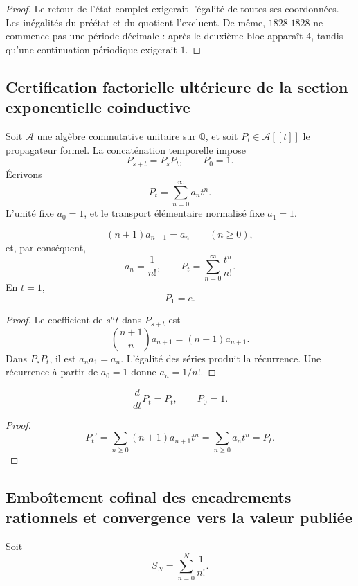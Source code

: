 \begin{proof}
Le retour de l’état complet exigerait l’égalité de toutes ses coordonnées.
Les inégalités du préétat et du quotient l’excluent. De même,
\(1828|1828\) ne commence pas une période décimale : après le deuxième bloc apparaît
\(4\), tandis qu’une continuation périodique exigerait \(1\).
\end{proof}

\subsection{Certification factorielle ultérieure de la section exponentielle coinductive}

Soit \(\mathcal A\) une algèbre commutative unitaire sur \(\mathbb Q\), et
soit \(P_t\in\mathcal A[[t]]\) le propagateur formel. La concaténation
temporelle impose
\[
 P_{s+t}=P_sP_t,
 \qquad
 P_0=1.
\]
Écrivons
\[
 P_t=\sum_{n=0}^{\infty}a_nt^n.
\]
L’unité fixe \(a_0=1\), et le transport élémentaire normalisé fixe
\(a_1=1\).

\begin{theorem}
\label{p12-83-c9-s2:thm:recurrencia-factorial-e}
\[
 (n+1)a_{n+1}=a_n
 \qquad(n\geq0),
\]
et, par conséquent,
\[
 a_n=\frac1{n!},
 \qquad
 P_t=\sum_{n=0}^{\infty}\frac{t^n}{n!}.
\]
En \(t=1\),
\[
 \boxed{P_1=e.}
\]
\end{theorem}

\begin{proof}
Le coefficient de \(s^nt\) dans \(P_{s+t}\) est
\[
 \binom{n+1}{n}a_{n+1}=(n+1)a_{n+1}.
\]
Dans \(P_sP_t\), il est \(a_na_1=a_n\). L’égalité des séries produit la
récurrence. Une récurrence à partir de \(a_0=1\) donne \(a_n=1/n!\).
\end{proof}

\begin{corollary}
\[
 \frac{d}{dt}P_t=P_t,
 \qquad P_0=1.
\]
\end{corollary}

\begin{proof}
\[
 P_t'=\sum_{n\geq0}(n+1)a_{n+1}t^n
 =\sum_{n\geq0}a_nt^n=P_t.
\]
\end{proof}

\subsection{Emboîtement cofinal des encadrements rationnels et convergence vers la valeur publiée}

Soit
\[
 S_N=\sum_{n=0}^{N}\frac1{n!}.
\]

